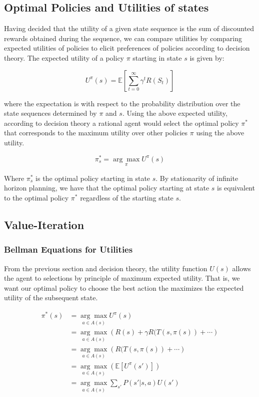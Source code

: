 \documentclass[11pt]{article}
\begin{document}
\subsection{Optimal Policies and Utilities of states}

Having decided that the utility of a given state sequence is the sum of discounted rewards obtained during the sequence, we can compare utilities by comparing expected utilities of policies to elicit preferences of policies according to decision theory. The expected utility of a policy $\pi$ starting in state $s$ is given by:

$$
U^{\pi}(s) = \mathbb{E} \left[ \sum^{\infty}_{t=0} \gamma^t R(S_t) \right]
$$

where the expectation is with respect to the probability distribution over the state sequences determined by $\pi$ and $s$. Using the above expected utility, according to decision theory a rational agent would select the optimal policy $\pi^*$ that corresponds to the maximum utility over other policies $\pi$ using the above utility.

$$
\pi^*_s = \underset{\pi}{\arg\max} U^{\pi}(s) 
$$

Where $\pi^*_s$ is the optimal policy starting in state $s$. By stationarity of infinite horizon planning, we have that the optimal policy starting at state $s$ is equivalent to the optimal policy $\pi^*$ regardless of the starting state $s$.

\subsection{Value-Iteration}

\subsubsection{Bellman Equations for Utilities}

From the previous section and decision theory, the utility function $U(s)$ allows the agent to selections by principle of maximum expected utility. That is, we want our optimal policy to choose the best action the maximizes the expected utility of the subsequent state.

$$
\begin{aligned}
\pi^*(s) &= \underset{a \in A(s)}{\arg\max} U^{\pi}(s)\\
&= \underset{a \in A(s)}{\arg\max} \left( R(s) + \gamma R(T(s, \pi(s)) + \cdots \right)\\
&= \underset{a \in A(s)}{\arg\max} \left(R(T(s, \pi(s)) + \cdots \right)\\
&= \underset{a \in A(s)}{\arg\max} \left( \mathbb{E}[U^{\pi}(s')] \right)\\
&= \underset{a \in A(s)}{\arg\max} \sum_{s'} P(s' | s, a) U(s')
\end{aligned}
$$
\end{document}
